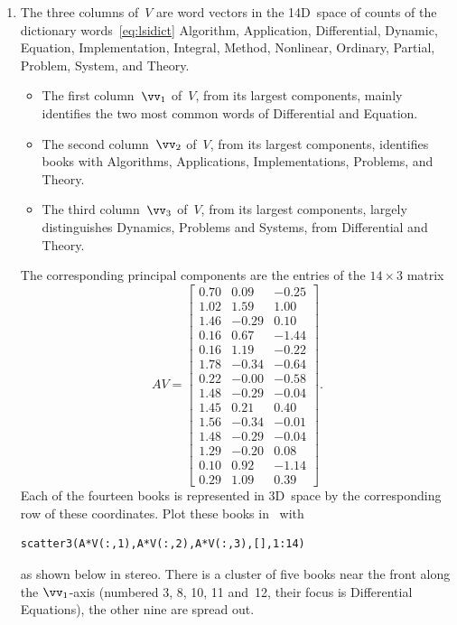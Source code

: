 \begin{enumerate}
\item The three columns of~\(V\) are word vectors in the 14D~space of counts of the dictionary words~\eqref{eq:lsidict} Algorithm,
Application,
Differential,
Dynamic,
Equation,
Implementation,
Integral,
Method,
Nonlinear,
Ordinary,
Partial,
Problem,
System, and
Theory.
\begin{itemize}
\item The first column~\(\vv_1\) of~\(V\), from its largest components, mainly identifies the two most common words of Differential and Equation.
\item The second column~\(\vv_2\) of~\(V\), from its largest components, identifies books with Algorithms, Applications, Implementations, Problems, and Theory.
\item The third column~\(\vv_3\) of~\(V\), from its largest components, largely distinguishes Dynamics, Problems and Systems, from Differential and Theory.
\end{itemize}
The corresponding principal components are the entries of the \(14\times3\) matrix \twodp
\begin{equation*}
AV=\begin{bmatrix} 0.70 & 0.09 & -0.25
\\1.02 & 1.59 & 1.00
\\1.46 & -0.29 & 0.10
\\0.16 & 0.67 & -1.44
\\0.16 & 1.19 & -0.22
\\1.78 & -0.34 & -0.64
\\0.22 & -0.00 & -0.58
\\1.48 & -0.29 & -0.04
\\1.45 & 0.21 & 0.40
\\1.56 & -0.34 & -0.01
\\1.48 & -0.29 & -0.04
\\1.29 & -0.20 & 0.08
\\0.10 & 0.92 & -1.14
\\0.29 & 1.09 & 0.39 \end{bmatrix}.
\end{equation*}
Each of the fourteen books is represented in 3D~space by the corresponding row of these coordinates.
Plot these books in \script\ with 
\begin{verbatim}
scatter3(A*V(:,1),A*V(:,2),A*V(:,3),[],1:14)
\end{verbatim}
as shown below in stereo.
There is a cluster of five books near the front along the \(\vv_1\)-axis (numbered 3, 8, 10, 11 and~12, their focus is Differential Equations), the other nine are spread out.
\end{enumerate}




